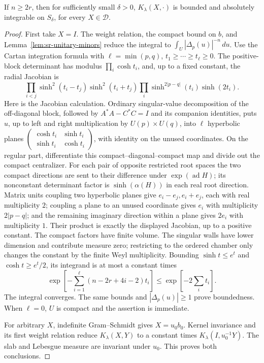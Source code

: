 \begin{srproposition}
\label{prop:sr-frame-slab-integrable}
If \(n\ge2r\), then for sufficiently small \(\delta>0\),
\(K_\lambda(X,\cdot)\) is bounded and absolutely integrable
on \(S_\delta\), for every \(X\in\mathcal D\).
\end{srproposition}

\begin{proof}
First take \(X=I\).  The weight relation, the compact bound on
\(b\), and Lemma~\ref{lem:sr-unitary-minors} reduce the integral to
\(\int_U|\Delta_p(u)|^{-n}\,du\).
Use the Cartan integration formula with
\(\ell=\min(p,q)\), \(t_1\ge\cdots\ge t_\ell\ge0\).
The positive-block determinant has modulus
\(\prod_i\cosh t_i\), and, up to a fixed constant, the radial
Jacobian is
\[
 \prod_{i<j}\sinh^2(t_i-t_j)\sinh^2(t_i+t_j)
 \prod_i\sinh^{2|p-q|}(t_i)\sinh(2t_i).
\]
Here is the Jacobian calculation.  Ordinary singular-value
decomposition of the off-diagonal block, followed by
\(A^*A-C^*C=I\) and its companion identities, puts \(u\), up
to left and right multiplication by \(U(p)\times U(q)\), into
\(\ell\) hyperbolic planes
\(\left(\begin{smallmatrix}\cosh t_i&\sinh t_i\\
\sinh t_i&\cosh t_i\end{smallmatrix}\right)\), with identity
on the unused coordinates.
On the regular part, differentiate this compact--diagonal--compact
map and divide out the compact centralizer.
For each pair of opposite restricted root spaces the two
compact directions are sent to their difference under
\(\exp(\operatorname{ad}H)\); its nonconstant determinant factor
is \(\sinh(\alpha(H))\) in each real root direction.
Matrix units coupling two hyperbolic planes give
\(e_i-e_j,e_i+e_j\), each with real multiplicity \(2\);
coupling a plane to an unused coordinate gives \(e_i\)
with multiplicity \(2|p-q|\); and the remaining imaginary
direction within a plane gives \(2e_i\) with multiplicity \(1\).
Their product is exactly the displayed Jacobian, up to a
positive constant.  The compact factors have finite volume.
The singular walls have lower dimension and contribute measure
zero; restricting to the ordered chamber only changes the
constant by the finite Weyl multiplicity.
Bounding \(\sinh t\le e^t\) and
\(\cosh t\ge e^t/2\), its integrand is at most a constant times
\[
 \exp\left[-\sum_{i=1}^{\ell}
                   (n-2r+4i-2)t_i\right]
 \le \exp\left[-2\sum_i t_i\right].
\]
The integral converges.  The same bounds and
\(|\Delta_p(u)|\ge1\) prove boundedness.
When \(\ell=0\), \(U\) is compact and the assertion is immediate.

For arbitrary \(X\), indefinite Gram--Schmidt gives
\(X=u_0b_0\).  Kernel invariance and its first weight relation
reduce \(K_\lambda(X,Y)\) to a constant times
\(K_\lambda(I,u_0^{-1}Y)\).
The slab and Lebesgue measure are invariant under \(u_0\).
This proves both conclusions.
\end{proof}

